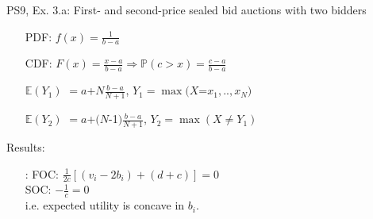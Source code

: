 \begin{frame}{PS9, Ex. 3.a: First- and second-price sealed bid auctions with two bidders}
\begin{multicols}{2}
\begin{enumerate}
        \item[PDF:] $f(x)=\frac{1}{b-a}$
        \item[CDF:] $F(x)=\frac{x-a}{b-a}\Rightarrow\mathbb{P}(c>x)=\frac{c-a}{b-a}$
        \item[$\mathbb{E}(Y_1)$] $=a$+$N\frac{b-a}{N+1}$, $Y_1=\max(X$=$x_1,..,x_N)$
        \item[$\mathbb{E}(Y_2)$] $=a$+$(N$-1$)\frac{b-a}{N+1}$, $Y_2=\max(X\neq Y_1)$
      \end{enumerate}
      \vspace{-6pt}
      Results:
      \vspace{-6pt}
      \begin{itemize}
        \item[\nth{2}:] FOC: $\frac{1}{2c}[(v_i-2b_i)+(d+c)]=0$\\
                        SOC: $-\frac{1}{c}=0$\\
                        i.e. expected utility is concave in $b_i$.
      \end{itemize}
      \vfill\null
    \end{multicols}
\end{frame}
